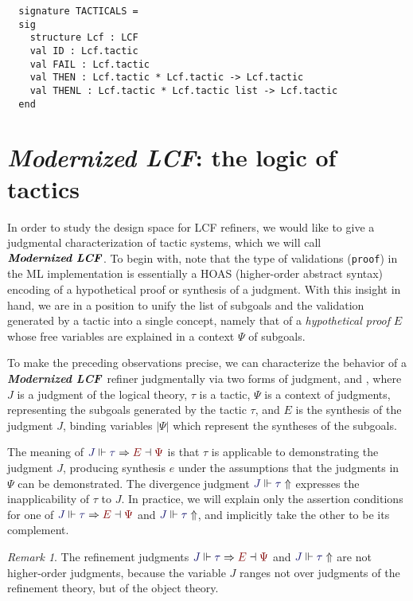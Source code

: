\documentclass[11pt]{article}
\theoremstyle{definition}
\theoremstyle{remark}
\newtheorem{remark}[thm]{Remark}
\numberwithin{equation}{section}
\def\IModeColorName{MidnightBlue}
\def\OModeColorName{Maroon}
\newcommand\IMode[1]{{\color{\IModeColorName}{#1}}}
\newcommand\OMode[1]{{\color{\OModeColorName}{#1}}}
\newcommand\JJ{J}
\newcommand\Refine[4]{\IMode{#1}\Vdash\IMode{#2}\Rightarrow\OMode{#4}\dashv\OMode{#3}}
\newcommand\NoRefine[2]{\IMode{#1}\Vdash\IMode{#2}\Uparrow}
\newcommand\Dom[1]{\left\vert#1\right\vert}
\newcommand\ModLCF{\textbf{\emph{Modernized LCF}}}
\begin{document}
\begin{lstlisting}
  signature TACTICALS =
  sig
    structure Lcf : LCF
    val ID : Lcf.tactic
    val FAIL : Lcf.tactic
    val THEN : Lcf.tactic * Lcf.tactic -> Lcf.tactic
    val THENL : Lcf.tactic * Lcf.tactic list -> Lcf.tactic
  end
\end{lstlisting}

\section{\ModLCF: the logic of tactics}

In order to study the design space for LCF refiners, we would like to give a
judgmental characterization of tactic systems, which we will call $\ModLCF$.
To begin with, note that the type of validations (\verb!proof!) in the ML
implementation is essentially a HOAS (higher-order abstract syntax) encoding
of a hypothetical proof or synthesis of a judgment.  With this insight in hand,
we are in a position to unify the list of subgoals and the validation generated
by a tactic into a single concept, namely that of a \emph{hypothetical proof}
$E$ whose free variables are explained in a context $\Psi$ of subgoals.

To make the preceding observations precise, we can characterize the behavior of
a \ModLCF\ refiner judgmentally via two forms of judgment,
\framebox{$\Refine{\JJ}{\tau}{\Psi}{E}$} and \framebox{$\NoRefine{\JJ}{\tau}$}, where $\JJ$ is a judgment of the
logical theory, $\tau$ is a tactic, $\Psi$ is a context of judgments,
representing the subgoals generated by the tactic $\tau$, and $E$ is the
synthesis of the judgment $\JJ$, binding variables $\Dom{\Psi}$ which represent
the syntheses of the subgoals.

The meaning of $\Refine{\JJ}{\tau}{\Psi}{E}$ is that $\tau$ is applicable to
demonstrating the judgment $\JJ$, producing synthesis $e$ under the assumptions
that the judgments in $\Psi$ can be demonstrated. The divergence judgment
$\NoRefine{\JJ}{\tau}$ expresses the inapplicability of $\tau$ to $\JJ$.  In
practice, we will explain only the assertion conditions for one of
$\Refine{\JJ}{\tau}{\Psi}{E}$ and $\NoRefine{\JJ}{\tau}$, and implicitly take
the other to be its complement.

\begin{remark}
  The refinement judgments $\Refine{\JJ}{\tau}{\Psi}{E}$ and
  $\NoRefine{\JJ}{\tau}$ are not higher-order judgments, because the variable
  $\JJ$ ranges not over judgments of the refinement theory, but of the
  object theory.
\end{remark}
\end{document}
